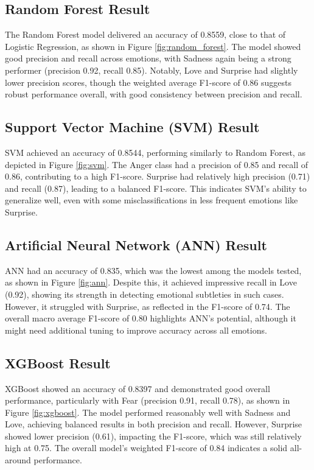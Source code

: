 \subsection{Random Forest Result}
The Random Forest model delivered an accuracy of 0.8559, close to that of Logistic Regression, as shown in Figure \ref{fig:random_forest}. The model showed good precision and recall across emotions, with Sadness again being a strong performer (precision 0.92, recall 0.85). Notably, Love and Surprise had slightly lower precision scores, though the weighted average F1-score of 0.86 suggests robust performance overall, with good consistency between precision and recall.

\subsection{Support Vector Machine (SVM) Result}
SVM achieved an accuracy of 0.8544, performing similarly to Random Forest, as depicted in Figure \ref{fig:svm}. The Anger class had a precision of 0.85 and recall of 0.86, contributing to a high F1-score. Surprise had relatively high precision (0.71) and recall (0.87), leading to a balanced F1-score. This indicates SVM's ability to generalize well, even with some misclassifications in less frequent emotions like Surprise.

\subsection{Artificial Neural Network (ANN) Result}
ANN had an accuracy of 0.835, which was the lowest among the models tested, as shown in Figure \ref{fig:ann}. Despite this, it achieved impressive recall in Love (0.92), showing its strength in detecting emotional subtleties in such cases. However, it struggled with Surprise, as reflected in the F1-score of 0.74. The overall macro average F1-score of 0.80 highlights ANN's potential, although it might need additional tuning to improve accuracy across all emotions.

\subsection{XGBoost Result}
XGBoost showed an accuracy of 0.8397 and demonstrated good overall performance, particularly with Fear (precision 0.91, recall 0.78), as shown in Figure \ref{fig:xgboost}. The model performed reasonably well with Sadness and Love, achieving balanced results in both precision and recall. However, Surprise showed lower precision (0.61), impacting the F1-score, which was still relatively high at 0.75. The overall model's weighted F1-score of 0.84 indicates a solid all-around performance.

